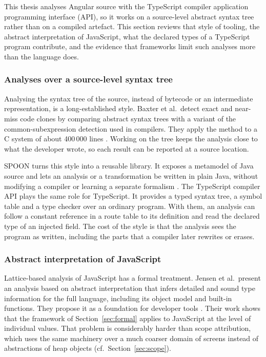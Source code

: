 This thesis analyses Angular source with the TypeScript compiler
application programming interface (API), so it works on a source-level abstract syntax tree
rather than on a compiled artefact. This section reviews that style of tooling, the abstract
interpretation of JavaScript, what the declared types of a TypeScript program contribute, and
the evidence that frameworks limit such analyses more than the language does.

\subsubsection{Analyses over a source-level syntax tree}

Analysing the syntax tree of the source, instead of bytecode or an intermediate representation,
is a long-established style. Baxter et al.\ detect exact and near-miss code clones by comparing
abstract syntax trees with a variant of the common-subexpression detection used in compilers.
They apply the method to a C system of about 400\,000 lines \cite{baxter1998clone}. Working on
the tree keeps the analysis close to what the developer wrote, so each result can be reported at
a source location.

SPOON turns this style into a reusable library. It exposes a metamodel of Java source and lets
an analysis or a transformation be written in plain Java, without modifying a compiler or
learning a separate formalism \cite{pawlak2016spoon}. The TypeScript compiler API plays the same
role for TypeScript. It provides a typed syntax tree, a symbol table and a type checker over an
ordinary program. With them, an analysis can follow a constant reference in a route table to its
definition and read the declared type of an injected field. The cost of the style is that the
analysis sees the program as written, including the parts that a compiler later rewrites or
erases.

\subsubsection{Abstract interpretation of JavaScript}

Lattice-based analysis of JavaScript has a formal treatment. Jensen et al.\ present an analysis
based on abstract interpretation that infers detailed and sound type information for the full
language, including its object model and built-in functions. They propose it as a foundation for
developer tools \cite{jensen2009type}. Their work shows that the framework of
Section~\ref{sec:formal} applies to JavaScript at the level of individual values. That problem is
considerably harder than scope attribution, which uses the same machinery over a much coarser
domain of screens instead of abstractions of heap objects (cf.~Section~\ref{sec:scope}).

